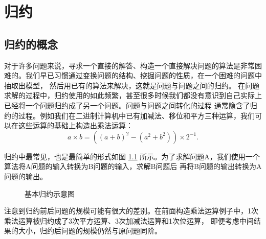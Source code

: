 \chapter{归约}


\section{归约的概念}

对于许多问题来说，寻求一个直接的解答、构造一个直接解决问题的算法是非常困难的。我们早已习惯通过变换问题的结构、挖掘问题的性质，在一个困难的问题中抽取出模型，
然后用已有的算法来解决，这就是问题与问题之间的归约。
在问题求解的过程中，归约使用的如此频繁，甚至很多时候我们都没有意识到自己实际上已经将一个问题归约成了另一个问题。问题与问题之间转化的过程
通常隐含了归约的过程。例如我们在二进制计算机中已有加减法、移位和平方三种运算，我们可以在这些运算的基础上构造出乘法运算：
$$a\times b = \left( (a+b)^2 - (a^2 + b^2) \right) \times 2^{-1}.$$






归约中最常见，也是最简单的形式如图 \ref{fig:reduction-show} 所示。为了求解问题A，我们使用一个算法将A问题的输入转换为B问题的输入，求解B问题后
再将B问题的输出转换为A问题的输出。

\begin{figure}[h]
 \center
 \caption{基本归约示意图}
 \label{fig:reduction-show}
\end{figure}

注意到归约前后问题的规模可能有很大的差别。在前面构造乘法运算例子中，1次乘法运算被归约成了3次平方运算、3次加减法运算和1次位运算，
即便考虑中间结果的大小，归约后问题的规模仍然与原问题同阶。

